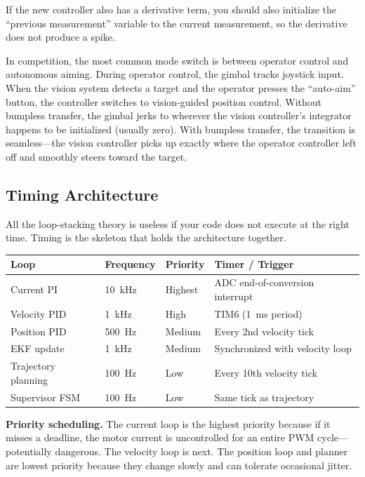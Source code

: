 If the new controller also has a derivative term, you should also initialize the ``previous measurement'' variable to the current measurement, so the derivative does not produce a spike.

In competition, the most common mode switch is between operator control and autonomous aiming. During operator control, the gimbal tracks joystick input. When the vision system detects a target and the operator presses the ``auto-aim'' button, the controller switches to vision-guided position control. Without bumpless transfer, the gimbal jerks to wherever the vision controller's integrator happens to be initialized (usually zero). With bumpless transfer, the transition is seamless---the vision controller picks up exactly where the operator controller left off and smoothly steers toward the target.

\subsection{Timing Architecture}

All the loop-stacking theory is useless if your code does not execute at the right time. Timing is the skeleton that holds the architecture together.

\begin{center}
\begin{tabular}{l l l l}
\hline
\textbf{Loop} & \textbf{Frequency} & \textbf{Priority} & \textbf{Timer / Trigger} \\
\hline
Current PI & 10~kHz & Highest & ADC end-of-conversion interrupt \\
Velocity PID & 1~kHz & High & TIM6 (1~ms period) \\
Position PID & 500~Hz & Medium & Every 2nd velocity tick \\
EKF update & 1~kHz & Medium & Synchronized with velocity loop \\
Trajectory planning & 100~Hz & Low & Every 10th velocity tick \\
Supervisor FSM & 100~Hz & Low & Same tick as trajectory \\
\hline
\end{tabular}
\end{center}

\textbf{Priority scheduling.} The current loop is the highest priority because if it misses a deadline, the motor current is uncontrolled for an entire PWM cycle---potentially dangerous. The velocity loop is next. The position loop and planner are lowest priority because they change slowly and can tolerate occasional jitter.

